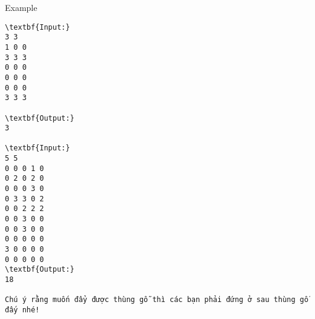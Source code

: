 Example
\begin{verbatim}
\textbf{Input:}
3 3
1 0 0
3 3 3
0 0 0
0 0 0
0 0 0
3 3 3

\textbf{Output:}
3

\textbf{Input:}
5 5
0 0 0 1 0
0 2 0 2 0
0 0 0 3 0
0 3 3 0 2
0 0 2 2 2
0 0 3 0 0
0 0 3 0 0
0 0 0 0 0
3 0 0 0 0
0 0 0 0 0
\textbf{Output:}
18

Chú ý rằng muốn đẩy được thùng gỗ thì các bạn phải đứng ở sau thùng gỗ đấy nhé!
\end{verbatim}